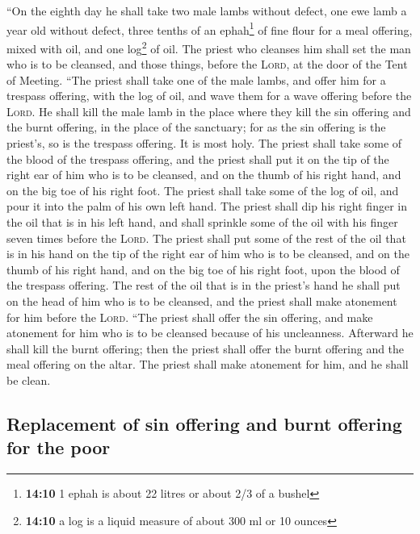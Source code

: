  ``On the eighth day he shall take two male lambs without
defect, one ewe lamb a year old without defect, three tenths of an
ephah\footnote{\textbf{14:10} 1 ephah is about 22 litres or about 2/3 of
  a bushel} of fine flour for a meal offering, mixed with oil, and one
log\footnote{\textbf{14:10} a log is a liquid measure of about 300 ml or
  10 ounces} of oil.  The priest who cleanses him shall
set the man who is to be cleansed, and those things, before the
\textsc{Lord}, at the door of the Tent of Meeting.  ``The
priest shall take one of the male lambs, and offer him for a trespass
offering, with the log of oil, and wave them for a wave offering before
the \textsc{Lord}.  He shall kill the male lamb in the
place where they kill the sin offering and the burnt offering, in the
place of the sanctuary; for as the sin offering is the priest's, so is
the trespass offering. It is most holy.  The priest shall
take some of the blood of the trespass offering, and the priest shall
put it on the tip of the right ear of him who is to be cleansed, and on
the thumb of his right hand, and on the big toe of his right foot.
 The priest shall take some of the log of oil, and pour
it into the palm of his own left hand.  The priest shall
dip his right finger in the oil that is in his left hand, and shall
sprinkle some of the oil with his finger seven times before the
\textsc{Lord}.  The priest shall put some of the rest of
the oil that is in his hand on the tip of the right ear of him who is to
be cleansed, and on the thumb of his right hand, and on the big toe of
his right foot, upon the blood of the trespass offering. 
The rest of the oil that is in the priest's hand he shall put on the
head of him who is to be cleansed, and the priest shall make atonement
for him before the \textsc{Lord}.  ``The priest shall
offer the sin offering, and make atonement for him who is to be cleansed
because of his uncleanness. Afterward he shall kill the burnt offering;
 then the priest shall offer the burnt offering and the
meal offering on the altar. The priest shall make atonement for him, and
he shall be clean.

\hypertarget{replacement-of-sin-offering-and-burnt-offering-for-the-poor}{%
\subsection{Replacement of sin offering and burnt offering for the
poor}\label{replacement-of-sin-offering-and-burnt-offering-for-the-poor}}

